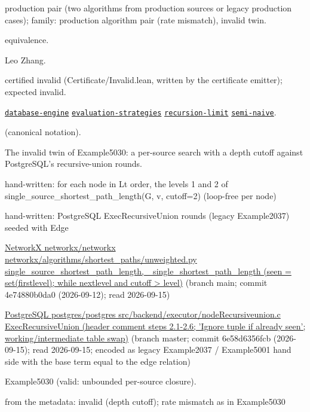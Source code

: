 \documentclass[10pt]{article}
\begin{document}
\begin{description}[leftmargin=2.6cm,style=nextline,itemsep=1pt]

\item[Category] production pair (two algorithms from production sources or legacy production cases); family: production algorithm pair (rate mismatch), invalid twin.

\item[Kind] equivalence.

\item[Contributors] Leo Zhang.

\item[Status] certified invalid (Certificate/Invalid.lean, written by the certificate emitter); expected invalid.

\item[Tags] \hyperref[tag:database-engine]{\texttt{database-engine}} \hyperref[tag:evaluation-strategies]{\texttt{evaluation-strategies}} \hyperref[tag:recursion-limit]{\texttt{recursion-limit}} \hyperref[tag:semi-naive]{\texttt{semi-naive}}.

\item[Input]  (canonical notation).

\item[Summary] The invalid twin of Example5030: a per-source search with a depth cutoff against PostgreSQL's recursive-union rounds.

\item[Sides] hand-written: for each node in Lt order, the levels 1 and 2 of single\_source\_shortest\_path\_length(G, v, cutoff=2) (loop-free per node) \par hand-written: PostgreSQL ExecRecursiveUnion rounds (legacy Example2037) seeded with Edge

\item[Sources] {\raggedright \href{https://github.com/networkx/networkx/blob/main/networkx/algorithms/shortest_paths/unweighted.py}{NetworkX networkx/networkx networkx/algorithms/shortest\_paths/unweighted.py single\_source\_shortest\_path\_length, \_single\_shortest\_path\_length (seen = set(firstlevel); while nextlevel and cutoff \textgreater{} level)} (branch main; commit 4e74880b0da0 (2026-09-12); read 2026-09-15) \par \href{https://github.com/postgres/postgres/blob/master/src/backend/executor/nodeRecursiveunion.c}{PostgreSQL postgres/postgres src/backend/executor/nodeRecursiveunion.c ExecRecursiveUnion (header comment steps 2.1-2.6; 'Ignore tuple if already seen'; working/intermediate table swap)} (branch master; commit 6e58d6356fcb (2026-09-15); read 2026-09-15; encoded as legacy Example2037 / Example5001 hand side with the base term equal to the edge relation)\par}

\item[Twin] Example5030 (valid: unbounded per-source closure).

\item[Obstruction note] from the metadata: invalid (depth cutoff); rate mismatch as in Example5030

\end{description}
\end{document}
